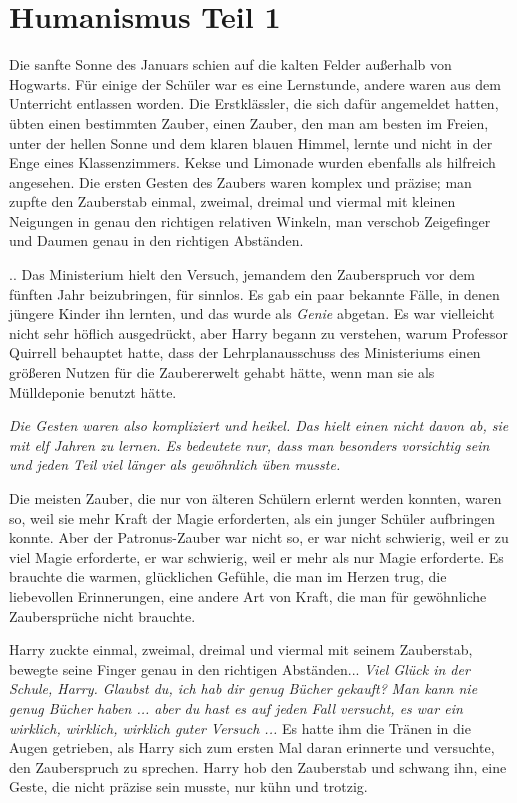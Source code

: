 \chapter{Humanismus Teil 1}

Die sanfte Sonne des Januars schien auf die kalten Felder außerhalb von
Hogwarts. Für einige der Schüler war es eine Lernstunde, andere waren aus dem
Unterricht entlassen worden. Die Erstklässler, die sich dafür angemeldet hatten,
übten einen bestimmten Zauber, einen Zauber, den man am besten im Freien, unter
der hellen Sonne und dem klaren blauen Himmel, lernte und nicht in der Enge
eines Klassenzimmers. Kekse und Limonade wurden ebenfalls als hilfreich
angesehen. Die ersten Gesten des Zaubers waren komplex und präzise; man zupfte
den Zauberstab einmal, zweimal, dreimal und viermal mit kleinen Neigungen in
genau den richtigen relativen Winkeln, man verschob Zeigefinger und Daumen genau
in den richtigen Abständen.

.. Das Ministerium hielt den Versuch, jemandem den Zauberspruch vor dem fünften
Jahr beizubringen, für sinnlos. Es gab ein paar bekannte Fälle, in denen jüngere
Kinder ihn lernten, und das wurde als \glqq \emph{Genie}\grqq{} abgetan. Es war
vielleicht nicht sehr höflich ausgedrückt, aber Harry begann zu verstehen, warum
Professor Quirrell behauptet hatte, dass der Lehrplanausschuss des Ministeriums
einen größeren Nutzen für die Zaubererwelt gehabt hätte, wenn man sie als
Mülldeponie benutzt hätte.

\emph{Die Gesten waren also kompliziert und heikel. Das hielt einen nicht davon ab, sie mit elf Jahren zu lernen. Es bedeutete nur, dass man besonders vorsichtig sein und jeden Teil viel länger als gewöhnlich üben musste.}

Die meisten Zauber, die nur von älteren Schülern erlernt werden konnten, waren
so, weil sie mehr Kraft der Magie erforderten, als ein junger Schüler aufbringen
konnte. Aber der Patronus-Zauber war nicht so, er war nicht schwierig, weil er
zu viel Magie erforderte, er war schwierig, weil er mehr als nur Magie
erforderte. Es brauchte die warmen, glücklichen Gefühle, die man im Herzen trug,
die liebevollen Erinnerungen, eine andere Art von Kraft, die man für gewöhnliche
Zaubersprüche nicht brauchte.

Harry zuckte einmal, zweimal, dreimal und viermal mit seinem Zauberstab, bewegte
seine Finger genau in den richtigen Abständen... \glqq \emph{Viel Glück in der
Schule, Harry. Glaubst du, ich hab dir genug Bücher gekauft?}\grqq{} \glqq
\emph{Man kann nie genug Bücher haben ... aber du hast es auf jeden Fall
versucht, es war ein wirklich, wirklich, wirklich guter Versuch ...\grqq{} } Es
hatte ihm die Tränen in die Augen getrieben, als Harry sich zum ersten Mal daran
erinnerte und versuchte, den Zauberspruch zu sprechen. Harry hob den Zauberstab
und schwang ihn, eine Geste, die nicht präzise sein musste, nur kühn und
trotzig.

